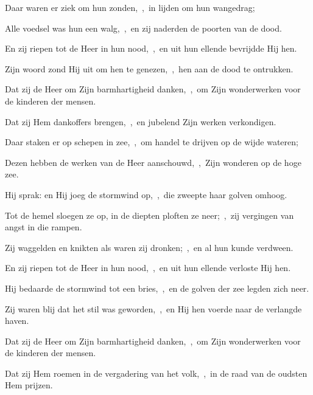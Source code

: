 \documentclass[12pt,twoside,a5paper]{article}
\begin{document}

\begin{halfparskip}
  Daar waren er ziek om hun zonden,~\sep\ in lijden om hun wangedrag;

  Alle voedsel was hun een walg,~\sep\ en zij naderden de poorten van de dood.

  En zij riepen tot de Heer in hun nood,~\sep\ en uit hun ellende bevrijdde Hij hen.

  Zijn woord zond Hij uit om hen te genezen,~\sep\ hen aan de dood te ontrukken.

  Dat zij de Heer om Zijn barmhartigheid danken,~\sep\ om Zijn wonderwerken voor de kinderen der mensen.

  Dat zij Hem dankoffers brengen,~\sep\ en jubelend Zijn werken verkondigen.
\end{halfparskip}


\begin{halfparskip}
  Daar staken er op schepen in zee,~\sep\ om handel te drijven op de wijde wateren;

  Dezen hebben de werken van de Heer aanschouwd,~\sep\ Zijn wonderen op de hoge zee.

  Hij sprak: en Hij joeg de stormwind op,~\sep\ die zweepte haar golven omhoog.

  Tot de hemel sloegen ze op, in de diepten ploften ze neer;~\sep\ zij vergingen van angst in die rampen.

  Zij waggelden en knikten als waren zij dronken;~\sep\ en al hun kunde verdween.

  En zij riepen tot de Heer in hun nood,~\sep\ en uit hun ellende verloste Hij hen.

  Hij bedaarde de stormwind tot een bries,~\sep\ en de golven der zee legden zich neer.

  Zij waren blij dat het stil was geworden,~\sep\ en Hij hen voerde naar de verlangde haven.

  Dat zij de Heer om Zijn barmhartigheid danken,~\sep\ om Zijn wonderwerken voor de kinderen der mensen.

  Dat zij Hem roemen in de vergadering van het volk,~\sep\ in de raad van de oudsten Hem prijzen.
\end{halfparskip}

\end{document}
